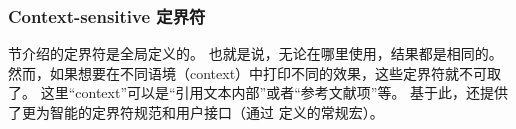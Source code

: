 \subsubsection{Context-sensitive 定界符}%
\label{use:fmt:csd}
 节介绍的定界符是全局定义的。
也就是说，无论在哪里使用，结果都是相同的。
然而，如果想要在不同语境（context）中打印不同的效果，这些定界符就不可取了。
这里“context”可以是“引用文本内部”或者“参考文献项”等。
基于此，\biblatex 还提供了更为智能的定界符规范和用户接口（通过  定义的常规宏）。

